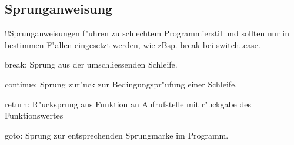       \subsection{Sprunganweisung}		
      !!Sprunganweisungen f"uhren zu schlechtem Programmierstil und sollten nur in bestimmen F"allen eingesetzt werden, wie zBsp. break bei switch..case.
	  	  \begin{compactitem}
	  		\item break: Sprung aus der umschliessenden Schleife.
	  		\item continue: Sprung zur"uck zur Bedingungspr"ufung einer Schleife.
	  		\item return: R"ucksprung aus Funktion an Aufrufstelle mit r"uckgabe des Funktionswertes
	  		\item goto: Sprung zur entsprechenden Sprungmarke im Programm.
	  	  \end{compactitem}	

    
    
     